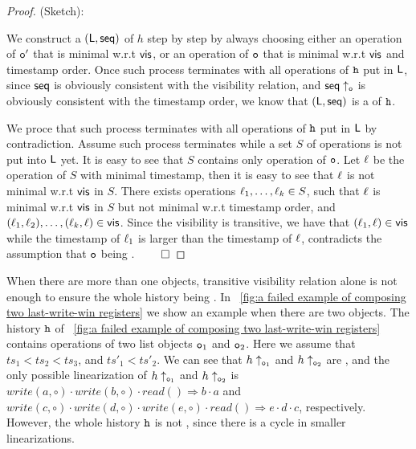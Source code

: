 \begin {proof} (Sketch):

We construct a \crdtlinearization $(\mathsf{L}, \mathsf{seq})$ of $h$ step by step by always choosing either an operation of $\mathtt{o}'$ that is minimal w.r.t $\mathsf{vis}$, or an operation of $\mathtt{o}$ that is minimal w.r.t $\mathsf{vis}$ and timestamp order. Once such process terminates with all operations of $\mathtt{h}$ put in $\mathsf{L}$, since $\mathsf{seq}$ is obviously consistent with the visibility relation, and $\mathsf{seq} \uparrow_{\mathtt{o}}$ is obviously consistent with the timestamp order, we know that $(\mathsf{L}, \mathsf{seq})$ is a \crdtlinearization of $\mathtt{h}$.

We proce that such process terminates with all operations of $\mathtt{h}$ put in $\mathsf{L}$ by contradiction. Assume such process terminates while a set $S$ of operations is not put into $\mathsf{L}$ yet. It is easy to see that $S$ contains only operation of $\mathtt{o}$. Let $\ell$ be the operation of $S$ with minimal timestamp, then it is easy to see that $\ell$ is not minimal w.r.t $\mathsf{vis}$ in $S$. There exists operations $\ell_1,\ldots,\ell_k \in S$, such that $\ell$ is minimal w.r.t $\mathsf{vis}$ in $S$ but not minimal w.r.t timestamp order, and $(\ell_1,\ell_2),\ldots,(\ell_k,\ell) \in \mathsf{vis}$. Since the visibility is transitive, we have that $(\ell_1,\ell) \in \mathsf{vis}$ while the timestamp of $\ell_1$ is larger than the timestamp of $\ell$, contradicts the assumption that $\mathtt{o}$ being \tonelinearizable{}. $\qed$
\end {proof}


When there are more than one \tonelinearizable{} objects, transitive visibility relation alone is not enough to ensure the whole history being \crdtlinearizable{}. In \figurename~\ref{fig:a failed example of composing two last-write-win registers} we show an example when there are two \tonelinearizable{} objects. The history $\mathtt{h}$ of \figurename~\ref{fig:a failed example of composing two last-write-win registers} contains operations of two list objects $\mathtt{o}_1$ and $\mathtt{o}_2$. Here we assume that $\mathit{ts}_1 < \mathit{ts}_2 < \mathit{ts}_3$, and $\mathit{ts}'_1 < \mathit{ts}'_2$. We can see that $h \uparrow_{\mathtt{o}_1}$ and $h \uparrow_{\mathtt{o}_2}$ are \crdtlinearizable, and the only possible linearization of $h \uparrow_{\mathtt{o}_1}$ and $h \uparrow_{\mathtt{o}_2}$ is $\mathit{write}(a,\circ) \cdot \mathit{write}(b,\circ) \cdot \mathit{read}() \Rightarrow b \cdot a$ and $\mathit{write}(c,\circ) \cdot \mathit{write}(d,\circ) \cdot \mathit{write}(e,\circ) \cdot \mathit{read}() \Rightarrow e \cdot d \cdot c$, respectively. However, the whole history $\mathtt{h}$ is not \crdtlinearizable, since there is a cycle in smaller linearizations.


